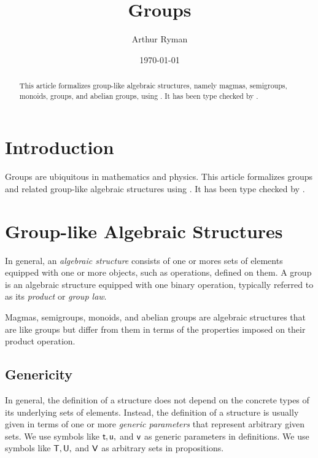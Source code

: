 \documentclass{amsart}
\begin{document}
\title{Groups}
\author{Arthur Ryman}
\date{\today}

\begin{abstract}
	This article formalizes group-like algebraic structures,
	namely  magmas, semigroups, monoids, groups, and abelian groups,
	using \ZN. It has been type checked by \fuzz.
\end{abstract}

\maketitle

\tableofcontents

\section{Introduction}

Groups are ubiquitous in mathematics and physics.
This article formalizes groups and related group-like algebraic structures using 
\ZN\cite{spivey-zrm}.
It has been type checked by \fuzz\cite{spivey-fm}.

\section{Group-like Algebraic Structures}

In general, an \textit{algebraic structure} consists of one or mores sets of elements 
equipped with one or more objects, such as operations, defined on them.
A group is an algebraic structure equipped with one binary operation, typically referred to
as its \textit{product} or \textit{group law}.

Magmas, semigroups, monoids, and abelian groups are 
algebraic structures that are like groups but differ from them 
in terms of the properties imposed on their product operation.

\subsection{Genericity}

In general, the definition of a structure does not depend on the concrete types
of its underlying sets of elements.
Instead, the definition of a structure is usually given in terms of one or more \textit{generic parameters}
that represent arbitrary given sets.
We use symbols like $\mathsf{t}, \mathsf{u},$  and $\mathsf{v}$ as generic parameters in definitions. 
We use symbols like $\mathsf{T}, \mathsf{U},$ and $\mathsf{V}$ as arbitrary sets in propositions.
\end{document}

